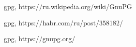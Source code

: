 \begin{thebibliography}{99}

gpg, https://ru.wikipedia.org/wiki/GnuPG

gpg, https://habr.com/ru/post/358182/

gpg, https://gnupg.org/

\end{thebibliography}